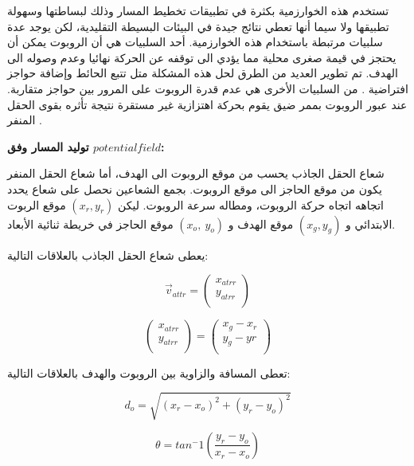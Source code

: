 تستخدم هذه الخوارزمية بكثرة في تطبيقات تخطيط المسار وذلك لبساطتها وسهولة تطبيقها ولا سيما أنها تعطي نتائج جيدة في البيئات البسيطة التقليدية، لكن يوجد عدة سلبيات مرتبطة باستخدام هذه الخوارزمية.
أحد السلبيات هي أن الروبوت يمكن أن يحتجز في قيمة صغرى محلية مما يؤدي الى توقفه عن الحركة نهائيا وعدم وصوله الى الهدف. تم تطوير العديد من الطرق لحل هذه المشكلة متل تتبع الحائط   \cite{d4}  وإضافة حواجز افتراضية \cite{d5}. من السلبيات الأخرى هي عدم قدرة الروبوت على المرور بين حواجز متقاربة. عند عبور الروبوت بممر ضيق يقوم بحركة اهتزازية غير مستقرة نتيجة تأثره بقوى الحقل المنفر \cite{d6}.


\textbf{توليد المسار وفق $ potential field $:}

شعاع الحقل الجاذب يحسب من موقع الروبوت الى الهدف، أما شعاع الحقل المنفر يكون من موقع الحاجز الى موقع الروبوت. بجمع الشعاعين نحصل على شعاع يحدد اتجاهه اتجاه حركة الروبوت، ومطاله سرعة الروبوت. ليكن $ (x_r,y_r) $ موقع الربوت الابتدائي و $ (x_g,y_g) $ موقع الهدف و $ (x_o,\ y_o)   $ موقع الحاجز في خريطة ثنائية الأبعاد.

يعطى شعاع الحقل الجاذب بالعلاقات التالية:

\begin{equation}
{\vec{v}}_{attr}=\left(\begin{matrix}x_{atrr}\\y_{atrr}\\\end{matrix}  \right)
\end{equation}

\begin{equation}
\left(\begin{matrix}x_{atrr}\\y_{atrr}\\\end{matrix}  \right)=\left(\begin{matrix}x_{g} - x_{r}\\y_{g} - y{r}\\\end{matrix}  \right)
\end{equation}

تعطى المسافة والزاوية بين الروبوت والهدف بالعلاقات التالية:

\begin{equation}
d_o=\sqrt{\left(x_r-x_o\right)^2+\left(y_r-y_o\right)^2}
\end{equation}

\begin{equation}
\theta = tan^-1(\frac{y_r - y_o}{x_r - x_o})
\end{equation}

